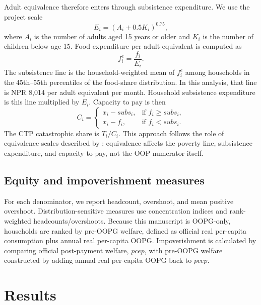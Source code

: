 \documentclass[11pt]{article}
\begin{document}
Adult equivalence therefore enters through subsistence expenditure. We use the project scale
\begin{equation}
E_i = (A_i + 0.5K_i)^{0.75},
\end{equation}
where $A_i$ is the number of adults aged 15 years or older and $K_i$ is the number of children below age 15. Food expenditure per adult equivalent is computed as
\begin{equation}
f_i^e = \frac{f_i}{E_i}.
\end{equation}
The subsistence line is the household-weighted mean of $f_i^e$ among households in the 45th--55th percentiles of the food-share distribution. In this analysis, that line is NPR 8,014 per adult equivalent per month. Household subsistence expenditure is this line multiplied by $E_i$. Capacity to pay is then
\begin{equation}
C_i =
\begin{cases}
x_i - subs_i, & \text{if } f_i \ge subs_i, \\
x_i - f_i, & \text{if } f_i < subs_i.
\end{cases}
\end{equation}
The CTP catastrophic share is $T_i/C_i$. This approach follows the role of equivalence scales described by \citet{koch2018}: equivalence affects the poverty line, subsistence expenditure, and capacity to pay, not the OOP numerator itself.

\subsection{Equity and impoverishment measures}

For each denominator, we report headcount, overshoot, and mean positive overshoot. Distribution-sensitive measures use concentration indices and rank-weighted headcounts/overshoots. Because this manuscript is OOPG-only, households are ranked by pre-OOPG welfare, defined as official real per-capita consumption plus annual real per-capita OOPG. Impoverishment is calculated by comparing official post-payment welfare, $pcep$, with pre-OOPG welfare constructed by adding annual real per-capita OOPG back to $pcep$.

\section{Results}
\end{document}
